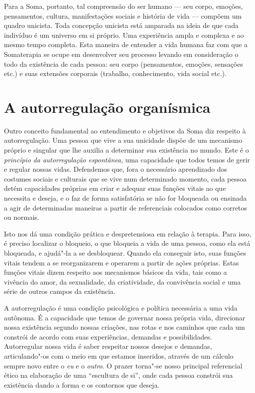 Para a Soma, portanto, tal compreensão do ser humano --- seu corpo,
emoções, pensamentos, cultura, manifestações sociais e história de vida
--- compõem um quadro unicista. Toda concepção unicista está amparada na
ideia de que cada indivíduo é um universo em si próprio. Uma experiência
ampla e complexa e ao mesmo tempo completa. Esta maneira de entender a
vida humana faz com que a Somaterapia se ocupe em desenvolver seu
processo levando em consideração o todo da existência de cada pessoa:
seu corpo (pensamentos, emoções, sensações etc.) e suas extensões
corporais (trabalho, conhecimento, vida social etc.).

\section{A autorregulação organísmica}

Outro conceito fundamental ao entendimento e objetivos da Soma diz
respeito à autorregulação. Uma pessoa que vive a sua unicidade dispõe de
um mecanismo próprio e singular que lhe auxilia a determinar sua
existência no mundo. Este é o \emph{princípio da autorregulação
espontânea,} uma capacidade que todos temos de gerir e regular nossas
vidas. Defendemos que, fora o necessário aprendizado dos costumes
sociais e culturais que se vive num determinado momento, cada pessoa
detém capacidades próprias em criar e adequar suas funções vitais ao que
necessita e deseja, e o faz de forma satisfatória se não for
bloqueada ou ensinada a agir de determinadas maneiras a partir de
referenciais colocados como corretos ou normais.

Isto nos dá uma condição prática e despretensiosa em relação à terapia.
Para isso, é preciso localizar o bloqueio, o que bloqueia a vida de uma
pessoa, como ela está bloqueada, e ajudá"-la a se desbloquear. Quando ela
conseguir isto, suas funções vitais tendem a se reorganizarem e operarem
a partir de ações próprias. Estas funções vitais dizem respeito aos
mecanismos básicos da vida, tais como a vivência do amor, da
sexualidade, da criatividade, da convivência social e uma série de
outros campos da existência.

A autorregulação é uma condição psicológica e política necessária a uma
vida autônoma. É a capacidade que temos de governar nossa própria vida,
direcionar nossa existência segundo nossas criações, nas rotas e nos
caminhos que cada um constrói de acordo com suas experiências, demandas
e possibilidades. Autorregular nossa vida é saber respeitar nossos
desejos e demandas, articulando"-os com o meio em que estamos inseridos,
através de um cálculo sempre novo entre o \emph{eu} e o \emph{outro}. O
prazer torna"-se nosso principal referencial ético na elaboração de uma
``escultura de si'', onde cada pessoa constrói sua existência dando a
forma e os contornos que deseja.


